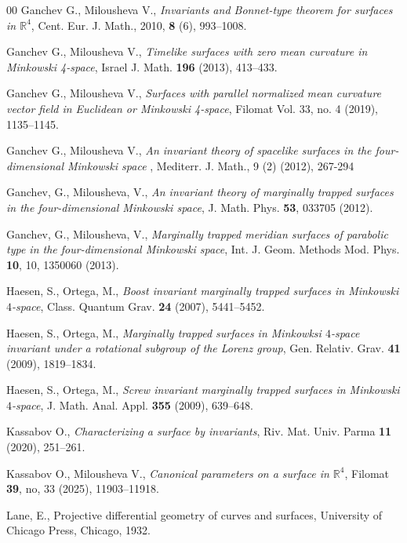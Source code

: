 \documentclass[12pt]{amsart}
\newcommand{\R}{\mathbb R}
\theoremstyle{definition}
\theoremstyle{remark}
\numberwithin{equation}{section}
\begin{document}
\begin{thebibliography}{00}
		Ganchev G., Milousheva V., \emph{Invariants and Bonnet-type theorem for
			surfaces in $\R^4$}, Cent. Eur. J. Math., 2010, \textbf{8} (6), 993--1008.

	
	Ganchev G.,  Milousheva V., \textit{Timelike surfaces with zero mean curvature in Minkowski 4-space}, Israel J. Math. 
	\textbf{196} (2013), 413--433.
	
	Ganchev G.,  Milousheva V.,  \textit{Surfaces with parallel normalized mean curvature vector field in Euclidean or Minkowski 4-space}, Filomat Vol. 33, no. 4 (2019), 1135--1145.
	
	Ganchev G.,  Milousheva V.,  \textit{An invariant theory of spacelike surfaces in the four-dimensional Minkowski space }, 	Mediterr. J. Math., 9 (2) (2012), 267-294
	
	
	Ganchev, G., Milousheva, V., \textit{An invariant theory of marginally trapped  surfaces in the four-dimensional Minkowski
		space}, J. Math. Phys. \textbf{53}, 033705 (2012).
	   
		Ganchev, G., Milousheva, V., \textit{Marginally trapped meridian surfaces of parabolic type in the four-dimensional Minkowski
			space}, Int. J. Geom. Methods Mod. Phys. \textbf{10}, 10, 1350060 (2013).
		
	
	
	
	Haesen, S., Ortega, M., \emph{Boost invariant marginally trapped
		surfaces in Minkowski $4$-space}, Class. Quantum Grav. \textbf{24}
	(2007), 5441--5452.
	
	Haesen, S., Ortega, M., \emph{Marginally trapped surfaces in
		Minkowksi $4$-space invariant under a rotational subgroup of the
		Lorenz group}, Gen. Relativ.  Grav. \textbf{41}  (2009),
	1819--1834.
	
	Haesen, S., Ortega, M., \emph{Screw invariant marginally trapped
		surfaces in Minkowski $4$-space}, J. Math. Anal. Appl.
	\textbf{355}  (2009), 639--648.
	
	Kassabov O., \textit{Characterizing a surface by invariants}, Riv. Mat. Univ. Parma \textbf{11} (2020), 251--261.
	
	Kassabov O., Milousheva V., \textit{Canonical parameters on a surface in $\mathbb R^4$}, Filomat  \textbf{39}, no, 33 (2025), 11903--11918.
	
Lane, E., Projective differential geometry of curves and
surfaces, University of Chicago Press, Chicago, 1932.


\end{thebibliography}
\end{document}
